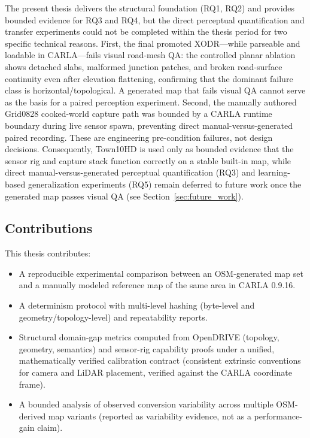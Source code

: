 The present thesis delivers the structural foundation (RQ1, RQ2) and provides bounded evidence for RQ3 and RQ4, but the direct perceptual quantification and transfer experiments could not be completed within the thesis period for two specific technical reasons. First, the final promoted XODR---while parseable and loadable in CARLA---fails visual road-mesh QA: the controlled planar ablation shows detached slabs, malformed junction patches, and broken road-surface continuity even after elevation flattening, confirming that the dominant failure class is horizontal/topological. A generated map that fails visual QA cannot serve as the basis for a paired perception experiment. Second, the manually authored Grid0828 cooked-world capture path was bounded by a CARLA runtime boundary during live sensor spawn, preventing direct manual-versus-generated paired recording. These are engineering pre-condition failures, not design decisions. Consequently, Town10HD is used only as bounded evidence that the sensor rig and capture stack function correctly on a stable built-in map, while direct manual-versus-generated perceptual quantification (RQ3) and learning-based generalization experiments (RQ5) remain deferred to future work once the generated map passes visual QA (see Section~\ref{sec:future_work}).

\subsection{Contributions}
This thesis contributes:
\begin{itemize}
  \item A reproducible experimental comparison between an OSM-generated map set and a manually modeled reference map of the same area in CARLA 0.9.16.
  \item A determinism protocol with multi-level hashing (byte-level and geometry/topology-level) and repeatability reports.
  \item Structural domain-gap metrics computed from OpenDRIVE (topology, geometry, semantics) and sensor-rig capability proofs under a unified, mathematically verified calibration contract (consistent extrinsic conventions for camera and LiDAR placement, verified against the CARLA coordinate frame).
  \item A bounded analysis of observed conversion variability across multiple OSM-derived map variants (reported as variability evidence, not as a performance-gain claim).
\end{itemize}

